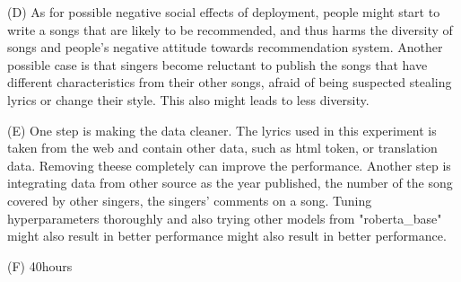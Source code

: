 \documentclass[a4paper,11pt]{article}
\begin{document}

(D)
As for possible negative social effects of deployment, people might start to write a songs that 
are likely to be recommended, and thus harms the diversity of songs and people's negative attitude towards recommendation system.
Another possible case is that singers become reluctant to publish the songs that have different characteristics from their other songs,
afraid of being suspected stealing lyrics or change their style.
This also might leads to less diversity.

(E)
One step is making the data cleaner.
The lyrics used in this experiment is taken from the web and contain other data, such as 
html token, or translation data. Removing theese completely can improve the performance.
Another step is integrating data from other source as the year published, the number of the song covered by other singers, 
the singers' comments on a song.
Tuning hyperparameters thoroughly and also trying other models from "roberta\_base" might also result in better performance might also result in better performance.


(F)
40hours
\end{document}

